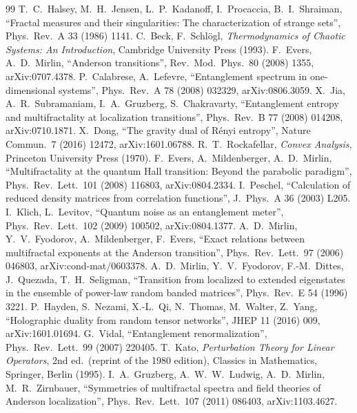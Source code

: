 \documentclass[11pt]{article}
\theoremstyle{definition}\newtheorem{definition}{Definition}[section]
\theoremstyle{remark}\newtheorem*{remark}{Remark}
\begin{document}
\begin{thebibliography}{99}
 T.~C.~Halsey, M.~H.~Jensen, L.~P.~Kadanoff, I.~Procaccia, B.~I.~Shraiman, ``Fractal measures and their singularities: The characterization of strange sets'', Phys.\ Rev.\ A 33 (1986) 1141.
 C.~Beck, F.~Schl\"ogl, \emph{Thermodynamics of Chaotic Systems: An Introduction}, Cambridge University Press (1993).
 F.~Evers, A.~D.~Mirlin, ``Anderson transitions'', Rev.\ Mod.\ Phys.\ 80 (2008) 1355, arXiv:0707.4378.
 P.~Calabrese, A.~Lefevre, ``Entanglement spectrum in one-dimensional systems'', Phys.\ Rev.\ A 78 (2008) 032329, arXiv:0806.3059.
 X.~Jia, A.~R.~Subramaniam, I.~A.~Gruzberg, S.~Chakravarty, ``Entanglement entropy and multifractality at localization transitions'', Phys.\ Rev.\ B 77 (2008) 014208, arXiv:0710.1871.
 X.~Dong, ``The gravity dual of R\'enyi entropy'', Nature Commun.\ 7 (2016) 12472, arXiv:1601.06788.
 R.~T.~Rockafellar, \emph{Convex Analysis}, Princeton University Press (1970).
 F.~Evers, A.~Mildenberger, A.~D.~Mirlin, ``Multifractality at the quantum Hall transition: Beyond the parabolic paradigm'', Phys.\ Rev.\ Lett.\ 101 (2008) 116803, arXiv:0804.2334.
 I.~Peschel, ``Calculation of reduced density matrices from correlation functions'', J.\ Phys.\ A 36 (2003) L205.
 I.~Klich, L.~Levitov, ``Quantum noise as an entanglement meter'', Phys.\ Rev.\ Lett.\ 102 (2009) 100502, arXiv:0804.1377.
 A.~D.~Mirlin, Y.~V.~Fyodorov, A.~Mildenberger, F.~Evers, ``Exact relations between multifractal exponents at the Anderson transition'', Phys.\ Rev.\ Lett.\ 97 (2006) 046803, arXiv:cond-mat/0603378.
 A.~D.~Mirlin, Y.~V.~Fyodorov, F.-M.~Dittes, J.~Quezada, T.~H.~Seligman, ``Transition from localized to extended eigenstates in the ensemble of power-law random banded matrices'', Phys.\ Rev.\ E 54 (1996) 3221.
 P.~Hayden, S.~Nezami, X.-L.~Qi, N.~Thomas, M.~Walter, Z.~Yang, ``Holographic duality from random tensor networks'', JHEP 11 (2016) 009, arXiv:1601.01694.
 G.~Vidal, ``Entanglement renormalization'', Phys.\ Rev.\ Lett.\ 99 (2007) 220405.
 T.~Kato, \emph{Perturbation Theory for Linear Operators}, 2nd ed.\ (reprint of the 1980 edition), Classics in Mathematics, Springer, Berlin (1995).
 I.~A.~Gruzberg, A.~W.~W.~Ludwig, A.~D.~Mirlin, M.~R.~Zirnbauer, ``Symmetries of multifractal spectra and field theories of Anderson localization'', Phys.\ Rev.\ Lett.\ 107 (2011) 086403, arXiv:1103.4627.

\end{thebibliography}
\end{document}
